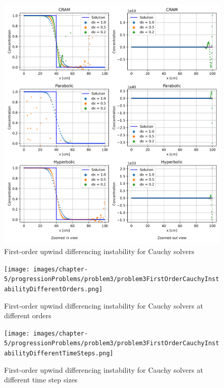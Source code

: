 \clearpage

\begin{figure}[p]
    \centering
    \includegraphics[width=6.0in]{images/chapter-5/progressionProblems/problem3/problem3FirstOrderCauchyInstability.png}
    \caption{First-order upwind differencing instability for Cauchy solvers}
    \label{fig:first_order_results_cauchy_instability}
\end{figure}

\clearpage

\begin{figure}[p]
    \centering
    \texttt{[image: images/chapter-5/progressionProblems/problem3/problem3FirstOrderCauchyInstabilityDifferentOrders.png]}
    \caption{First-order upwind differencing instability for Cauchy solvers at different orders}
    \label{fig:first_order_results_cauchy_instability_different_orders}
\end{figure}

\clearpage

\begin{figure}[p]
    \centering
    \texttt{[image: images/chapter-5/progressionProblems/problem3/problem3FirstOrderCauchyInstabilityDifferentTimeSteps.png]}
    \caption{First-order upwind differencing instability for Cauchy solvers at different time step sizes}
    \label{fig:first_order_results_cauchy_instability_different_time_steps}
\end{figure}

